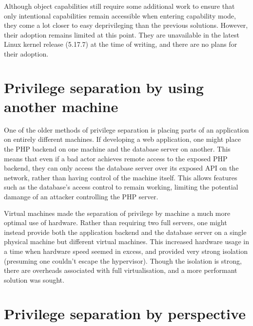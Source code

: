 \documentclass[12pt,a4paper,twoside]{report}
\begin{document}
Although object capabilities still require some additional work to ensure that only intentional capabilities remain accessible when entering capability mode, they come a lot closer to easy deprivileging than the previous solutions. However, their adoption remains limited at this point. They are unavailable in the latest Linux kernel release (5.17.7) at the time of writing, and there are no plans for their adoption.

\section{Privilege separation by using another machine}
\label{sec:priv-sep-another-machine}

One of the older methods of privilege separation is placing parts of an application on entirely different machines. If developing a web application, one might place the PHP backend on one machine and the database server on another. This means that even if a bad actor achieves remote access to the exposed PHP backend, they can only access the database server over its exposed API on the network, rather than having control of the machine itself. This allows features such as the database's access control to remain working, limiting the potential damange of an attacker controlling the PHP server.

Virtual machines \citep{barham_xen_2003,vmware_inc_understanding_2008} made the separation of privilege by machine a much more optimal use of hardware. Rather than requiring two full servers, one might instead provide both the application backend and the database server on a single physical machine but different virtual machines. This increased hardware usage in a time when hardware speed seemed in excess, and provided very strong isolation (presuming one couldn't escape the hypervisor). Though the isolation is strong, there are overheads associated with full virtualisation, and a more performant solution was sought.

\section{Privilege separation by perspective}
\label{sec:priv-sep-perspective}
\end{document}
